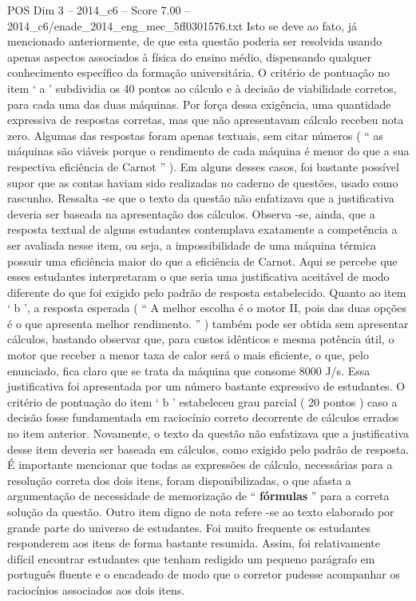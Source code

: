 \begin{textsample}{POS Dim 3 – 2014\_c6 – Score 7.00 – 2014\_c6/enade\_2014\_eng\_mec\_5ff0301576.txt}
Isto se deve ao fato, já mencionado anteriormente, de que esta questão poderia ser resolvida usando apenas aspectos associados à física do ensino médio, dispensando qualquer conhecimento específico da formação universitária.
O critério de pontuação no item ‘ a ’ subdividia os 40 pontos ao cálculo e à decisão de viabilidade corretos, para cada uma das duas máquinas.
Por força dessa exigência, uma quantidade expressiva de respostas corretas, mas que não apresentavam cálculo recebeu nota zero.
Algumas das respostas foram apenas textuais, sem citar números ( “ as máquinas são viáveis porque o rendimento de cada máquina é menor do que a sua respectiva eficiência de Carnot ” ).
Em alguns desses casos, foi bastante possível supor que as contas haviam sido realizadas no caderno de questões, usado como rascunho.
Ressalta -se que o texto da questão não enfatizava que a justificativa deveria ser baseada na apresentação dos cálculos.
Observa -se, ainda, que a resposta textual de alguns estudantes contemplava exatamente a competência a ser avaliada nesse item, ou seja, a impossibilidade de uma máquina térmica possuir uma eficiência maior do que a eficiência de Carnot.
Aqui se percebe que esses estudantes interpretaram o que seria uma justificativa aceitável de modo diferente do que foi exigido pelo padrão de resposta estabelecido.
Quanto ao item ‘ b ’, a resposta esperada ( “ A melhor escolha é o motor II, pois das duas opções é o que apresenta melhor rendimento. ” ) também pode ser obtida sem apresentar cálculos, bastando observar que, para custos idênticos e mesma potência útil, o motor que receber a menor taxa de calor será o mais eficiente, o que, pelo enunciado, fica claro que se trata da máquina que consome 8000 J/s.
Essa justificativa foi apresentada por um número bastante expressivo de estudantes.
O critério de pontuação do item ‘ b ’ estabeleceu grau parcial ( 20 pontos ) caso a decisão fosse fundamentada em raciocínio correto decorrente de cálculos errados no item anterior.
Novamente, o texto da questão não enfatizava que a justificativa desse item deveria ser baseada em cálculos, como exigido pelo padrão de resposta.
É importante mencionar que todas as expressões de cálculo, necessárias para a resolução correta dos dois itens, foram disponibilizadas, o que afasta a argumentação de necessidade de memorização de “ \textbf{fórmulas} ” para a correta solução da questão.
Outro item digno de nota refere -se ao texto elaborado por grande parte do universo de estudantes.
Foi muito frequente os estudantes responderem aos itens de forma bastante resumida.
Assim, foi relativamente difícil encontrar estudantes que tenham redigido um pequeno parágrafo em português fluente e o encadeado de modo que o corretor pudesse acompanhar os raciocínios associados aos dois itens.

\end{textsample}
